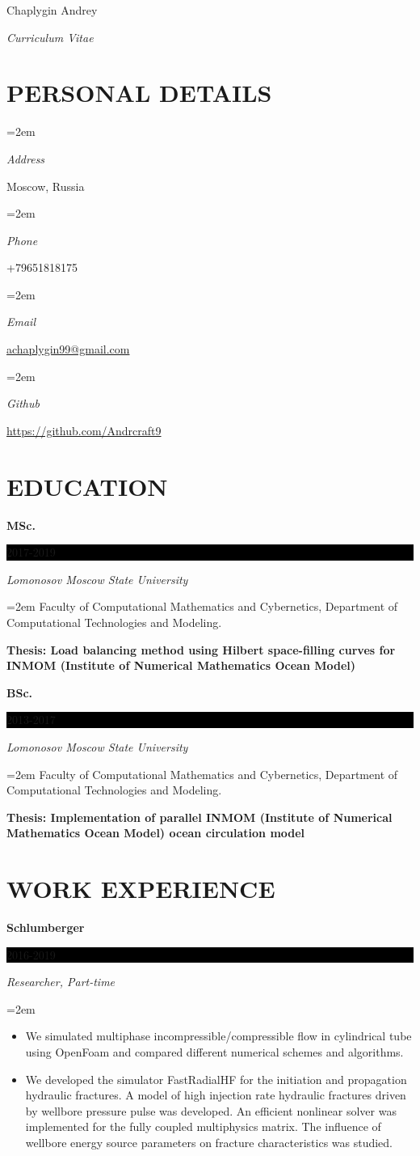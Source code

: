 \documentclass[paper=a4,fontsize=11pt]{scrartcl}
\newlength{\spacebox}
\newcommand{\sepspace}{\vspace*{1em}}		%
\newcommand{\MyName}[1]{ %
		\Huge \usefont{OT1}{phv}{b}{n} \hfill #1
		\par \normalsize \normalfont}
\newcommand{\MySlogan}[1]{ %
		\large \usefont{OT1}{phv}{m}{n}\hfill \textit{#1}
		\par \normalsize \normalfont}
\newcommand{\NewPart}[1]{\section*{\uppercase{#1}}}
\newcommand{\PersonalEntry}[2]{
		\noindent\hangindent=2em\hangafter=0 %
		\parbox{\spacebox}{        %
		\textit{#1}}		       %
		\hspace{1.5em} #2 \par}    %
\newcommand{\EducationEntry}[4]{
		\noindent \textbf{#1} \hfill      %
		\colorbox{Black}{%
			\parbox{6em}{%
			\hfill\color{White}#2}} \par  %
		\noindent \textit{#3} \par        %
		\noindent\hangindent=2em\hangafter=0 \small #4 %
		\normalsize \par}
\begin{document}

\MyName{Chaplygin Andrey}
\MySlogan{Curriculum Vitae}

\sepspace

\NewPart{Personal details}{}

\PersonalEntry{Address}{Moscow, Russia}
\PersonalEntry{Phone}{+79651818175}
\PersonalEntry{Email}{\url{achaplygin99@gmail.com}}
\PersonalEntry{Github}{\url{https://github.com/Andrcraft9}}

\NewPart{Education}{}

\EducationEntry{MSc.}{2017-2019}{Lomonosov Moscow State University}
{Faculty of Computational Mathematics and Cybernetics, 
Department of Computational Technologies and Modeling.

{\bf Thesis: Load balancing method using Hilbert space-filling curves for INMOM
(Institute of Numerical Mathematics Ocean Model)}}
\sepspace

\EducationEntry{BSc.}{2013-2017}{Lomonosov Moscow State University}
{Faculty of Computational Mathematics and Cybernetics, 
Department of Computational Technologies and Modeling.

{\bf Thesis: Implementation of parallel INMOM (Institute of Numerical Mathematics Ocean Model) ocean circulation model}}

\NewPart{Work experience}{}

\EducationEntry{Schlumberger}{2016-2019}{Researcher, Part-time} %
{
\begin{itemize}
 \item
 We simulated multiphase incompressible/compressible flow in cylindrical tube using OpenFoam and compared different numerical schemes and algorithms.
 
 \item We developed the simulator FastRadialHF for the initiation and propagation hydraulic fractures. 
A model of high injection rate hydraulic fractures driven by wellbore pressure pulse was developed. 
An efficient nonlinear solver was implemented for the fully coupled multiphysics matrix.
The influence of wellbore energy source parameters on fracture characteristics was studied.
\end{itemize}

}
\sepspace
\end{document}

